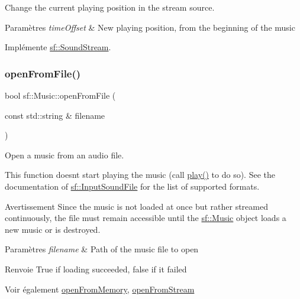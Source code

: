 Change the current playing position in the stream source. 


\begin{DoxyParams}{Paramètres}
{\em time\+Offset} & New playing position, from the beginning of the music \\
\hline
\end{DoxyParams}


Implémente \hyperlink{classsf_1_1SoundStream_a907036dd2ca7d3af5ead316e54b75997}{sf\+::\+Sound\+Stream}.

\mbox{\label{classsf_1_1Music_a3edc66e5f5b3f11e84b90eaec9c7d7c0}} 
\subsubsection{\texorpdfstring{open\+From\+File()}{openFromFile()}}
{\footnotesize\ttfamily bool sf\+::\+Music\+::open\+From\+File (\begin{DoxyParamCaption}\item[{const std\+::string \&}]{filename }\end{DoxyParamCaption})}



Open a music from an audio file. 

This function doesn\textquotesingle{}t start playing the music (call \hyperlink{classsf_1_1SoundStream_afdc08b69cab5f243d9324940a85a1144}{play()} to do so). See the documentation of \hyperlink{classsf_1_1InputSoundFile}{sf\+::\+Input\+Sound\+File} for the list of supported formats.

\begin{DoxyWarning}{Avertissement}
Since the music is not loaded at once but rather streamed continuously, the file must remain accessible until the \hyperlink{classsf_1_1Music}{sf\+::\+Music} object loads a new music or is destroyed.
\end{DoxyWarning}

\begin{DoxyParams}{Paramètres}
{\em filename} & Path of the music file to open\\
\hline
\end{DoxyParams}
\begin{DoxyReturn}{Renvoie}
True if loading succeeded, false if it failed
\end{DoxyReturn}
\begin{DoxySeeAlso}{Voir également}
\hyperlink{classsf_1_1Music_ae93b21bcf28ff0b5fec458039111386e}{open\+From\+Memory}, \hyperlink{classsf_1_1Music_a4e55d1910a26858b44778c26b237d673}{open\+From\+Stream} 
\end{DoxySeeAlso}
\mbox{\label{classsf_1_1Music_ae93b21bcf28ff0b5fec458039111386e}} 
